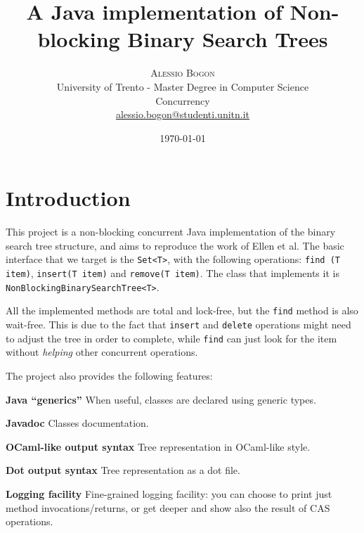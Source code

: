 \documentclass[a4paper,draft,12pt]{article}
\title{\textbf{A Java implementation of Non-blocking Binary Search Trees}} %
\author{
    \textsc{Alessio Bogon}\\[2mm] %
    \normalsize University of Trento - Master Degree in Computer Science\\ %
    \normalsize Concurrency\\
    \href{mailto:alessio.bogon@studenti.unitn.it}{alessio.bogon@studenti.unitn.it} %
}
\date{\today}
\begin{document}
\maketitle


\section{Introduction} %
\label{sec:introduction}
This project is a non-blocking concurrent Java implementation of the binary search tree structure, and aims to reproduce the work of Ellen et al\cite{ellen10}.
The basic interface that we target is the \texttt{Set<T>}, with the following operations: \texttt{find (T item)}, \texttt{insert(T item)} and \texttt{remove(T item)}.
The class that implements it is \texttt{Non\-Blocking\-Binary\-Search\-Tree\-<T>}.

All the implemented methods are total and lock-free, but the \texttt{find} method is also wait-free.
This is due to the fact that \texttt{insert} and \texttt{delete} operations might need to adjust the tree in order to complete, while \texttt{find} can just look for the item without \emph{helping} other concurrent operations.

The project also provides the following features:
\begin{compactitem}
    \item[\textbf{Java ``generics''}] When useful, classes are declared using generic types.
    \item[\textbf{Javadoc}] Classes documentation.
    \item[\textbf{OCaml-like output syntax}] Tree representation in OCaml-like style.
    \item[\textbf{Dot output syntax}] Tree representation as a dot file.
    \item[\textbf{Logging facility}] Fine-grained logging facility: you can choose to print just method invocations/\-returns, or get deeper and show also the result of CAS operations.
\end{compactitem}



\end{document}
